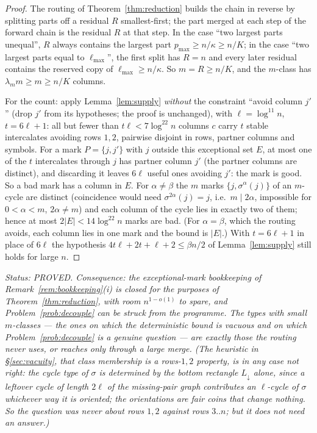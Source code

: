 \begin{proof}
The routing of Theorem~\ref{thm:reduction} builds the chain in
reverse by splitting parts off a residual $R$ smallest-first; the
part merged at each step of the forward chain is the residual $R$ at
that step.  In the case ``two largest parts unequal'', $R$ always
contains the largest part $p_{\max}\ge n/\kappa\ge n/K$; in the case
``two largest parts equal to $\ell_{\max}$'', the first split has
$R=n$ and every later residual contains the reserved copy of
$\ell_{\max}\ge n/\kappa$.  So $m=R\ge n/K$, and the $m$-class has
$\lambda_mm\ge m\ge n/K$ columns.

For the count: apply Lemma~\ref{lem:supply} \emph{without} the
constraint ``avoid column $j'$'' (drop $j'$ from its hypotheses; the
proof is unchanged), with $\ell=\log^{11}n$, $t=6\ell+1$: all but
fewer than $t\ell<7\log^{22}n$ columns $c$ carry $t$ stable
intercalates avoiding rows $1,2$, pairwise disjoint in rows, partner
columns and symbols.  For a mark $P=\{j,j'\}$ with $j$ outside this
exceptional set $E$, at most one of the $t$ intercalates through $j$
has partner column $j'$ (the partner columns are distinct), and
discarding it leaves $6\ell$ useful ones avoiding $j'$: the mark is
good.  So a bad mark has a column in $E$.  For $\alpha\ne\beta$ the
$m$ marks $\{j,\sigma^\alpha(j)\}$ of an $m$-cycle are distinct
(coincidence would need $\sigma^{2\alpha}(j)=j$, i.e.\ $m\mid2\alpha$,
impossible for $0<\alpha<m$, $2\alpha\ne m$) and each column of the
cycle lies in exactly two of them; hence at most $2|E|<14\log^{22}n$
marks are bad.  (For $\alpha=\beta$, which the routing avoids, each
column lies in one mark and the bound is $|E|$.)  With $t=6\ell+1$
in place of $6\ell$ the hypothesis $4t\ell+2t+\ell+2\le\beta n/2$ of
Lemma~\ref{lem:supply} still holds for large $n$.
\end{proof}

\emph{Status: PROVED.  Consequence: the exceptional-mark bookkeeping
of Remark~\ref{rem:bookkeeping}(i) is closed for the purposes of
Theorem~\ref{thm:reduction}, with room $n^{1-o(1)}$ to spare, and
Problem~\ref{prob:decouple} can be struck from the programme.  The
types with small $m$-classes --- the ones on which the deterministic
bound is vacuous and on which Problem~\ref{prob:decouple} is a
genuine question --- are exactly those the routing never uses, or
reaches only through a large merge.  (The heuristic in
\S\ref{sec:vacuity}, that class membership is a rows-$1,2$ property,
is in any case not right: the cycle type of $\sigma$ is determined by
the bottom rectangle $L_\downarrow$ alone, since a leftover cycle of
length $2\ell$ of the missing-pair graph contributes an $\ell$-cycle
of $\sigma$ whichever way it is oriented; the orientations are fair
coins that change nothing.  So the question was never about rows
$1,2$ against rows $3..n$; but it does not need an answer.)}

